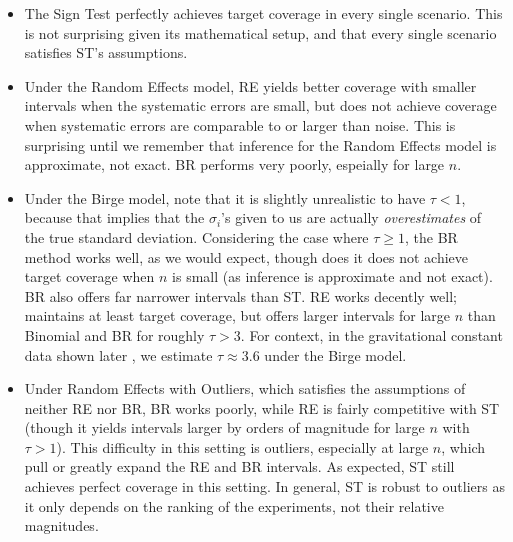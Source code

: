 \documentclass[12pt]{article}
\begin{document}
\begin{itemize}
\item
  The Sign Test perfectly achieves target coverage in every single scenario. This is not surprising given its mathematical setup, and that every single scenario satisfies ST's assumptions.
\item
  Under the Random Effects model, RE yields better coverage with smaller intervals when the systematic errors are small, but does not achieve coverage when systematic errors are comparable to or larger than noise. This is surprising until we remember that inference for the Random Effects model is approximate, not exact. BR performs very poorly, espeially for large $n$.
\item
  Under the Birge model, note that it is slightly unrealistic to have $\tau<1$, because that implies that the $\sigma_i$'s given to us are actually \emph{overestimates} of the true standard deviation. Considering the case where $\tau\geq 1$, the BR method works well, as we would expect, though does it does not achieve target coverage when $n$ is small (as inference is approximate and not exact). BR also offers far narrower intervals than ST. RE works decently well; maintains at least target coverage, but offers larger intervals for large $n$ than Binomial and BR for roughly $\tau>3$. For context, in the gravitational constant data shown later \citep{tiesinga2021codata}, we estimate $\tau\approx 3.6$ under the Birge model.
\item
  Under Random Effects with Outliers, which satisfies the assumptions of neither RE nor BR, BR works poorly, while RE is fairly competitive with ST (though it yields intervals larger by orders of magnitude for large $n$ with $\tau>1$). This difficulty in this setting is outliers, especially at large $n$, which pull or greatly expand the RE and BR intervals. As expected, ST still achieves perfect coverage in this setting. In general, ST is robust to outliers as it only depends on the ranking of the experiments, not their relative magnitudes.
\end{itemize}
\end{document}
